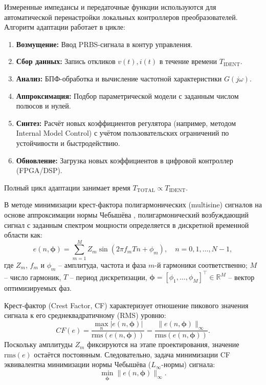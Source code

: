 Измеренные импедансы и передаточные функции используются для автоматической перенастройки локальных контроллеров преобразователей. Алгоритм адаптации работает в цикле:
\begin{enumerate}
    \item \textbf{Возмущение:} Ввод PRBS-сигнала в контур управления.
    \item \textbf{Сбор данных:} Запись откликов $v(t), i(t)$ в течение времени $T_{\text{IDENT}}$.
    \item \textbf{Анализ:} БПФ-обработка и вычисление частотной характеристики $G(j\omega)$.
    \item \textbf{Аппроксимация:} Подбор параметрической модели с заданным числом полюсов и нулей.
    \item \textbf{Синтез:} Расчёт новых коэффициентов регулятора (например, методом Internal Model Control) с учётом пользовательских ограничений по устойчивости и быстродействию.
    \item \textbf{Обновление:} Загрузка новых коэффициентов в цифровой контроллер (FPGA/DSP).
\end{enumerate}
Полный цикл адаптации занимает время $T_{\text{TOTAL}} \propto T_{\text{IDENT}}$.

В методе минимизации крест-фактора полигармонических (multisine) сигналов на основе аппроксимации нормы Чебышёва \cite{Zhang2025}, \cite{guillaume1991crest} полигармонический возбуждающий сигнал с заданным спектром мощности определяется в дискретной временной области как:
\begin{equation}
    e(n, \boldsymbol{\phi}) = \sum_{m=1}^{M} Z_m \sin(2\pi f_m T n + \phi_m), \quad n = 0, 1, \dots, N-1,
    \label{eq:multisine}
\end{equation}
где $Z_m$, $f_m$ и $\phi_m$ -- амплитуда, частота и фаза $m$-й гармоники соответственно; $M$ -- число гармоник, $T$ -- период дискретизации, $\boldsymbol{\phi} = [\phi_1, \dots, \phi_M]^\top \in \mathbb{R}^M$ -- вектор оптимизируемых фаз.

Крест-фактор (Crest Factor, CF) характеризует отношение пикового значения сигнала к его среднеквадратичному (RMS) уровню:
\begin{equation}
CF(e) = \frac{\max_n |e(n, \boldsymbol{\phi})|}{\text{rms}(e(n, \boldsymbol{\phi}))} = \frac{\|e(n, \boldsymbol{\phi})\|_\infty}{\text{rms}(e(n, \boldsymbol{\phi}))}.
\label{eq:cf_def}
\end{equation}
Поскольку амплитуды $Z_m$ фиксируются на этапе проектирования, значение $\text{rms}(e)$ остаётся постоянным. Следовательно, задача минимизации CF эквивалентна минимизации нормы Чебышёва ($L_\infty$-нормы) сигнала:
\begin{equation}
\min_{\boldsymbol{\phi}} \|e(n, \boldsymbol{\phi})\|_\infty.
\label{eq:optim_problem}
\end{equation}

